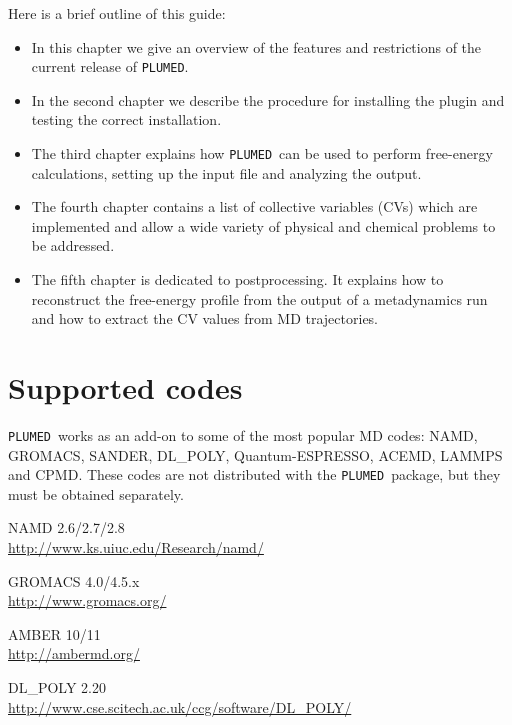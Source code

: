 \documentclass[12pt,fleqn]{report}
\newcommand{\plumed}{{\tt PLUMED}}
\begin{document}
Here is a brief outline of this guide:
\begin{itemize}
\item In this chapter we give  an overview
of the features and restrictions of  the current release of \plumed.
\item In the second chapter we describe the
procedure for installing the plugin and  testing the correct installation.
\item The third chapter explains how \plumed \ can be used to perform free-energy calculations, 
setting up the input file and analyzing the output.
\item The fourth chapter contains  a list of collective variables (CVs) which are implemented
and allow a wide variety of physical and chemical problems to be addressed.
\item The fifth chapter is dedicated to postprocessing. It explains how to reconstruct the
free-energy profile from the output of a metadynamics run and how to extract the CV values from MD trajectories.
\end{itemize}

\section{Supported codes}
\label{supported}
 \plumed \ works as an add-on to some of the most popular MD codes:
NAMD, GROMACS, SANDER, DL\_POLY, Quantum-ESPRESSO, ACEMD, LAMMPS and CPMD.
These codes are not distributed with the \plumed \ package, but they must be obtained separately.
\vspace{0.3cm}

NAMD 2.6/2.7/2.8   \\    \url{http://www.ks.uiuc.edu/Research/namd/}

\vspace{0.3cm}

GROMACS 4.0/4.5.x    \\   \url{http://www.gromacs.org/}

\vspace{0.3cm}

AMBER 10/11            \\     \url{http://ambermd.org/}

\vspace{0.3cm}

DL\_POLY 2.20     \\  \url{http://www.cse.scitech.ac.uk/ccg/software/DL\_POLY/}
\end{document}
